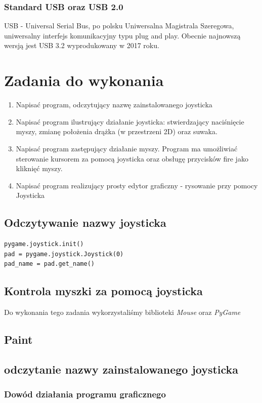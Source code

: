 \documentclass[a4paper,12pt]{extarticle}  %
\begin{document}
\subsubsection{Standard USB oraz USB 2.0}
USB - Universal Serial Bus, po polsku Uniwersalna Magistrala Szeregowa, uniwersalny interfejs komunikacyjny typu plug and play.
Obecnie najnowszą wersją jest USB 3.2 wyprodukowany w 2017 roku.
\section{Zadania do wykonania}
\begin{enumerate}
	\item Napisać program, odczytujący nazwę zainstalowanego joysticka
	\item Napisać program ilustrujący działanie joysticka: stwierdzający naciśnięcie myszy, zmianę położenia drążka (w przestrzeni 2D) oraz suwaka.
	\item Napisać program zastępujący działanie myszy. Program ma umożliwiać sterowanie kursorem za pomocą joysticka oraz obsługę przycisków fire jako kliknięć myszy.
	\item Napisać program realizujący prosty edytor graficzny - rysowanie przy pomocy Joysticka
\end{enumerate}
\subsection{Odczytywanie nazwy joysticka}
\begin{lstlisting}
pygame.joystick.init()
pad = pygame.joystick.Joystick(0)
pad_name = pad.get_name()
\end{lstlisting}
\subsection{Kontrola myszki za pomocą joysticka}
Do wykonania tego zadania wykorzystaliśmy biblioteki \emph{Mouse} oraz \emph{PyGame}

\cleardoublepage
\subsection{Paint}
\subsection{odczytanie nazwy zainstalowanego joysticka}

\subsubsection{Dowód działania programu graficznego}
\begin{figure}[H]
   \centering
\end{figure}
\end{document}
